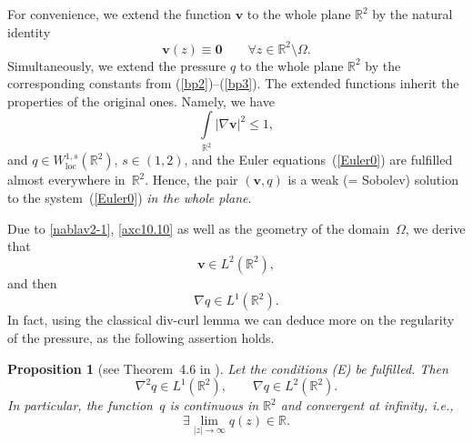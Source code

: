 \documentclass[11pt]{article}
\newtheorem{proposition}[theorem]{Proposition}
\numberwithin{equation}{section}
\numberwithin{figure}{section}
\newcommand{\R}{\mathbb{R}}
\def\loc{{\mathrm{loc}}}
\def\R{{\mathbb R}}
\def\ve{{\mathbf v}}
\def\0{{\mathbf 0}}
\begin{document}
For convenience, we extend the function $\ve$ to the whole plane $\R^2$
by the natural identity
\begin{equation}
\label{axc10.10} \ve(z)\equiv\0\qquad\forall z\in \R^2\setminus\Omega.
\end{equation}
Simultaneously, we extend the pressure $q$ to the whole plane $\R^2$ by the corresponding constants
from (\ref{bp2})--(\ref{bp3}). The extended functions inherit the properties of the
original ones. Namely, we have
\begin{equation} \label{nablav2-1}
	\int\limits_{\R^2} |\nabla\ve|^2 \le 1,
\end{equation}
and $q\in W^{1,s}_\loc(\R^2)$, $s\in(1,2)$, and the Euler equations~(\ref{Euler0}) are
fulfilled almost everywhere in~$\R^2$. Hence, the pair
$(\ve,q)$ is a weak (= Sobolev) solution to the system~(\ref{Euler0}) {\it in the whole plane}.


Due to \eqref{nablav2-1}, \eqref{axc10.10} as well as  the geometry of the domain~$\Omega$, we derive that
\begin{equation} \label{bp4}
\ve\in L^2(\R^2),
\end{equation}
and then
\begin{equation} \label{hp4-2}
	\nabla q\in L^1(\R^2).
\end{equation}
In fact, using the classical div-curl lemma we can deduce more on the regularity of the pressure, as the following assertion holds.

 \begin{proposition}[see Theorem~4.6 in \cite{KPR20}]
\label{pp} {\sl Let the conditions {\rm (E)} be fulfilled. Then
\begin{equation} \label{co-1}
\nabla^2 q\in L^1(\R^2), \qquad\nabla q\in L^2(\R^2).
\end{equation}
In particular, the function~$q$ is continuous in $\R^2$ and convergent at infinity, i.e.,
\begin{equation} \label{co-2}
\exists \lim\limits_{|z|\to\infty}q(z)\in \R.
\end{equation}}
\end{proposition}
\end{document}
